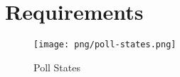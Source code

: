 \section{Requirements}

\begin{figure}
\centering
\texttt{[image: png/poll-states.png]}
\caption{Poll States}
\end{figure}